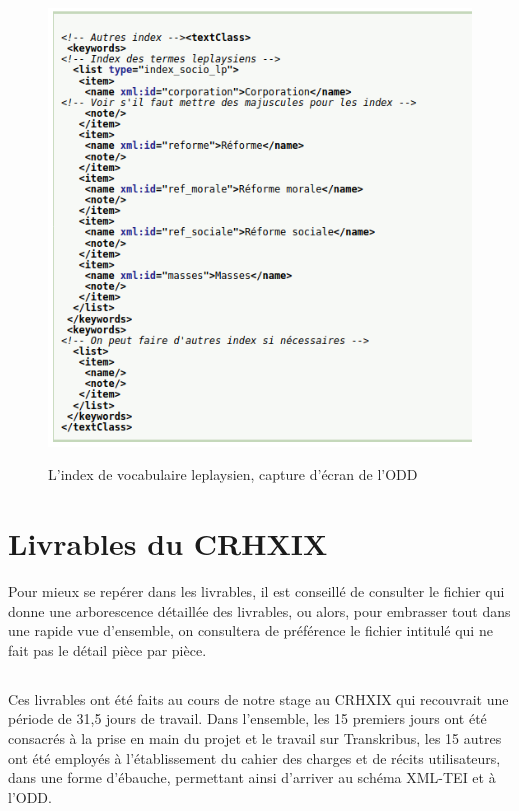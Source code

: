\begin{figure}[H]
    \centering
    \caption{L'index de vocabulaire leplaysien, capture d'écran de l'ODD}
    \includegraphics[width=14cm]{images/indexLP.png}
    \label{indexLP}
\end{figure}

\chapter{Livrables du CRHXIX}

Pour mieux se repérer dans les livrables, il est conseillé de consulter le fichier  qui donne une arborescence détaillée des livrables, ou alors, pour embrasser tout dans une rapide vue d'ensemble, on consultera de préférence le fichier intitulé  qui ne fait pas le détail pièce par pièce. 

\section{}

Ces livrables ont été faits au cours de notre stage au CRHXIX qui recouvrait une période de 31,5 jours de travail.
Dans l'ensemble, les 15 premiers jours ont été consacrés à la prise en main du projet et le travail sur Transkribus, les 15 autres ont été employés à l'établissement du cahier des charges et de récits utilisateurs, dans une forme d'ébauche, permettant ainsi d'arriver au schéma XML-TEI et à l'ODD.



